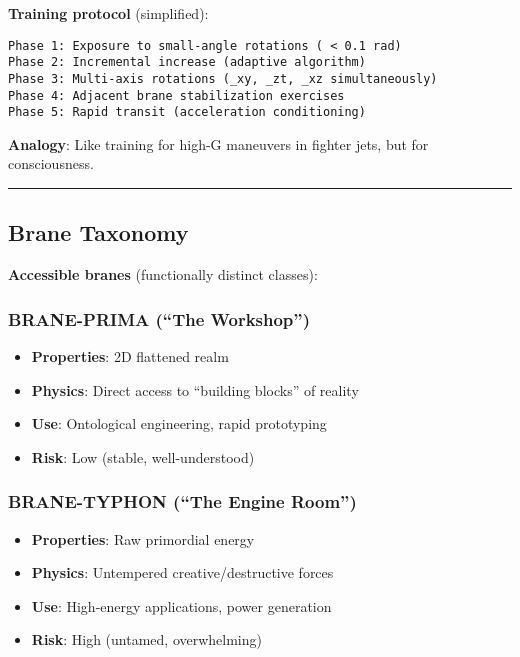 \textbf{Training protocol} (simplified):

\begin{verbatim}
Phase 1: Exposure to small-angle rotations ( < 0.1 rad)
Phase 2: Incremental increase (adaptive algorithm)
Phase 3: Multi-axis rotations (_xy, _zt, _xz simultaneously)
Phase 4: Adjacent brane stabilization exercises
Phase 5: Rapid transit (acceleration conditioning)
\end{verbatim}

\textbf{Analogy}: Like training for high-G maneuvers in fighter jets,
but for consciousness.

\begin{center}\rule{0.5\linewidth}{0.5pt}\end{center}

\subsection{Brane Taxonomy}\label{brane-taxonomy}

\textbf{Accessible branes} (functionally distinct classes):

\subsubsection{BRANE-PRIMA (``The
Workshop'')}\label{brane-prima-the-workshop}

\begin{itemize}
\tightlist
\item
  \textbf{Properties}: 2D flattened realm
\item
  \textbf{Physics}: Direct access to ``building blocks'' of reality
\item
  \textbf{Use}: Ontological engineering, rapid prototyping
\item
  \textbf{Risk}: Low (stable, well-understood)
\end{itemize}

\subsubsection{BRANE-TYPHON (``The Engine
Room'')}\label{brane-typhon-the-engine-room}

\begin{itemize}
\tightlist
\item
  \textbf{Properties}: Raw primordial energy
\item
  \textbf{Physics}: Untempered creative/destructive forces
\item
  \textbf{Use}: High-energy applications, power generation
\item
  \textbf{Risk}: High (untamed, overwhelming)
\end{itemize}

